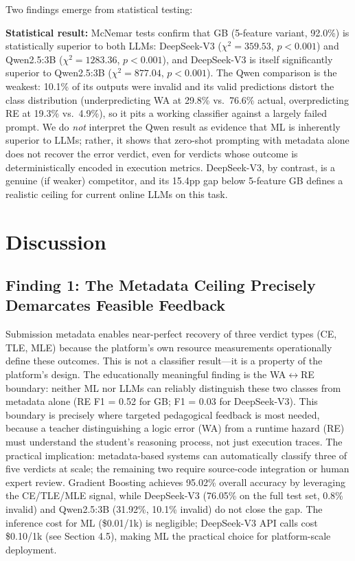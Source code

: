 \documentclass[acmsmall]{acmart}
\begin{document}
Two findings emerge from statistical testing:

\textbf{Statistical result:} McNemar tests confirm that GB (5-feature
variant, 92.0\%) is statistically superior to both LLMs: DeepSeek-V3
($\chi^2 = 359.53$, $p < 0.001$) and Qwen2.5:3B ($\chi^2 = 1283.36$,
$p < 0.001$), and DeepSeek-V3 is itself significantly superior to Qwen2.5:3B
($\chi^2 = 877.04$, $p < 0.001$). The Qwen comparison is the weakest:
10.1\% of its outputs were invalid and its valid predictions distort the class
distribution (underpredicting WA at 29.8\% vs.\ 76.6\% actual, overpredicting
RE at 19.3\% vs.\ 4.9\%), so it pits a working classifier against a
largely failed prompt. We do \emph{not} interpret the Qwen result as evidence
that ML is inherently superior to LLMs; rather, it shows that zero-shot
prompting with metadata alone does not recover the error verdict, even for
verdicts whose outcome is deterministically encoded in execution metrics.
DeepSeek-V3, by contrast, is a genuine (if weaker) competitor, and its 15.4pp
gap below 5-feature GB defines a realistic ceiling for current online LLMs on this task.

\section{Discussion}

\subsection{Finding 1: The Metadata Ceiling Precisely Demarcates Feasible Feedback}

Submission metadata enables near-perfect recovery of three verdict types
(CE, TLE, MLE) because the platform's own resource measurements operationally
define these outcomes. This is not a classifier result---it is a property of the
platform's design. The educationally meaningful finding is the
WA$\leftrightarrow$RE boundary: neither ML nor LLMs can reliably distinguish
these two classes from metadata alone (RE F1 = 0.52 for GB; F1 = 0.03 for
DeepSeek-V3). This boundary is precisely where targeted pedagogical feedback
is most needed, because a teacher distinguishing a logic error (WA) from a
runtime hazard (RE) must understand the student's reasoning process, not just
execution traces. The practical implication: metadata-based systems can
automatically classify three of five verdicts at scale; the remaining two
require source-code integration or human expert review. Gradient Boosting
achieves 95.02\% overall accuracy by leveraging the CE/TLE/MLE signal, while
DeepSeek-V3 (76.05\% on the full test set, 0.8\% invalid) and Qwen2.5:3B
(31.92\%, 10.1\% invalid) do not close the gap. The inference cost for ML
(\$0.01/1k) is negligible; DeepSeek-V3 API calls cost \$0.10/1k (see Section 4.5),
making ML the practical choice for platform-scale deployment.
\end{document}
